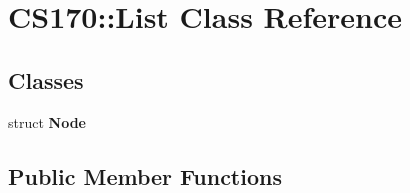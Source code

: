 \hypertarget{class_c_s170_1_1_list}{\section{C\-S170\-:\-:List Class Reference}
\label{class_c_s170_1_1_list}
}
\subsection*{Classes}
\begin{DoxyCompactItemize}
\item 
struct {\bfseries Node}
\end{DoxyCompactItemize}
\subsection*{Public Member Functions}
